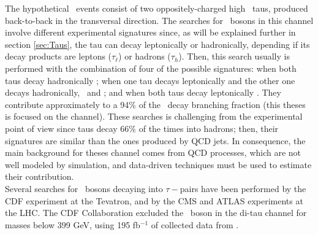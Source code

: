 \begin{itemize}
\noindent The hypothetical \Zprimetotautau~events consist of 
two oppositely-charged high \pt~taus, produced back-to-back in the transversal 
direction. The searches for \Zprime~bosons in this channel involve different experimental 
signatures since, as will be explained further in section \ref{sec:Taus}, the tau can decay leptonically or 
hadronically, depending if its decay products are leptons ($\tau_{\ell}$) or 
hadrons ($\tau_{h}$). Then, this search usually is performed with the combination of four 
of the possible signatures: when both taus decay hadronically \Zprimetotauh; when one tau decays 
leptonically and the other one decays hadronically,
\Zprimetotaue~and \Zprimetotaumu; and when both taus decay leptonically \Zprimetoemu. They contribute 
approximately to a 94$\%$ of the \Zprime~decay branching fraction (this theses is focused on 
the \Zprimetotauh channel). These searches is challenging from the experimental point 
of view since taus decay 66$\%$ of the times into hadrons; then, their signatures are 
similar than the ones produced by QCD jets. In consequence, the main background for theses 
channel comes from QCD processes, which are not well modeled by simulation, and data-driven 
techniques must be used to estimate their contribution. \\




\noindent Several searches for \Zprime~bosons decaying into  $\tau-$pairs have 
been performed by the CDF \cite{CDFZprimeditaubib} experiment at the Tevatron, and by the 
CMS \cite{CMSZprimetotautaurun1, CMSZprimetotautauemu, CMSZprimetotautau2015} and 
ATLAS \cite{ATLASZprimetotautau2016, ATLASZprimetotautau2015, ATLASZprimetotautaurun1, ATLASZprimetotautau2011} experiments 
at the LHC. The CDF Collaboration excluded the \ZprimeSSM~boson in the di-tau channel
for masses below 399 GeV, using 195 fb$^{-1}$ of collected data from \cite{CDFZprimeditaubib}. \\


\end{itemize}
